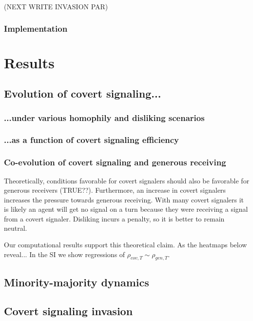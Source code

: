\documentclass[11pt,letterpaper]{article}
\begin{document}
(NEXT WRITE INVASION PAR)


\subsubsection{Implementation}




\section{Results}

\subsection{Evolution of covert signaling...}

\subsubsection{...under various homophily and disliking scenarios}

\subsubsection{...as a function of covert signaling efficiency}

\subsubsection{Co-evolution of covert signaling and generous receiving}

Theoretically, conditions favorable for covert
signalers should also be favorable for generous receivers (TRUE??). Furthermore, 
an increase in covert signalers increases the pressure towards generous receiving.
With many covert signalers it is likely an agent will get no signal on a 
turn because they were receiving a signal from a covert signaler. Disliking
incurs a penalty, so it is better to remain neutral.

Our computational results support this theoretical claim. As the heatmaps
below reveal... In the SI we show regressions of $\rho_{cov,T} \sim \rho_{gen,T}$.

\subsection{Minority-majority dynamics}

\subsection{Covert signaling invasion}
\end{document}
